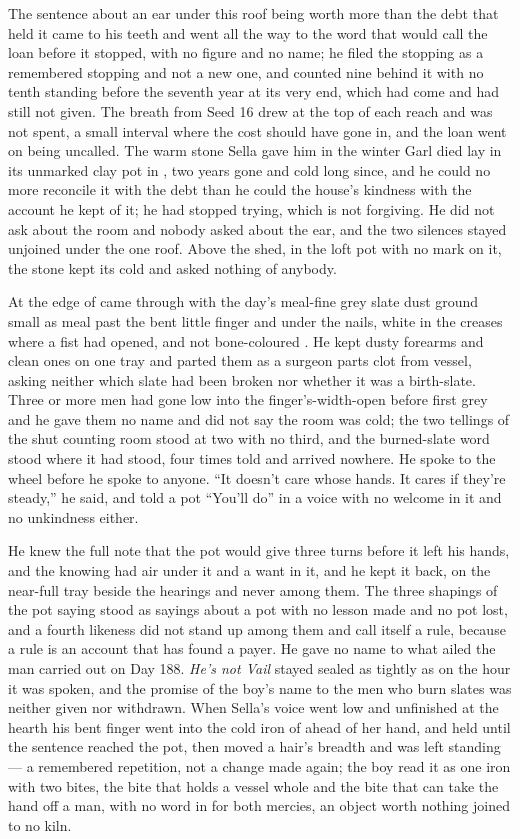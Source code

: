 The sentence about an ear under this roof being worth more than the debt that held it came to his teeth and went all the way to the word that would call the loan before it stopped, with no figure and no name; he filed the stopping as a remembered stopping and not a new one, and counted nine behind it with no tenth standing before the seventh year at its very end, which had come and had still not given. The breath from Seed 16 drew at the top of each reach and was not spent, a small interval where the cost should have gone in, and the loan went on being uncalled. The warm stone Sella gave him in the winter Garl died lay in its unmarked clay pot in , two years gone and cold long since, and he could no more reconcile it with the debt than he could the house's kindness with the account he kept of it; he had stopped trying, which is not forgiving. He did not ask about the room and nobody asked about the ear, and the two silences stayed unjoined under the one roof. Above the shed, in the loft pot with no mark on it, the stone kept its cold and asked nothing of anybody.

At the edge of   came through with the day's meal-fine grey slate dust ground small as meal past the bent little finger and under the nails, white in the creases where a fist had opened, and not bone-coloured . He kept dusty forearms and clean ones on one tray and parted them as a surgeon parts clot from vessel, asking neither which slate had been broken nor whether it was a birth-slate. Three or more men had gone low into the finger's-width-open  before first grey and he gave them no name and did not say the room was cold; the two tellings of the shut counting room stood at two with no third, and the burned-slate word stood where it had stood, four times told and arrived nowhere. He spoke to the wheel before he spoke to anyone. “It doesn't care whose hands. It cares if they're steady,” he said, and told a pot “You'll do” in a voice with no welcome in it and no unkindness either.

He knew the full note that the pot would give three turns before it left his hands, and the knowing had air under it and a want in it, and he kept it back, on the near-full tray beside the hearings and never among them. The three shapings of the pot saying stood as sayings about a pot with no lesson made and no pot lost, and a fourth likeness did not stand up among them and call itself a rule, because a rule is an account that has found a payer. He gave no name to what ailed the man carried out on Day 188. \emph{He's not Vail} stayed sealed as tightly as on the hour it was spoken, and the promise of the boy's name to the men who burn slates was neither given nor withdrawn. When Sella's voice went low and unfinished at the hearth his bent finger went into the cold iron of  ahead of her hand, and held until the sentence reached the pot, then moved a hair's breadth and was left standing --- a remembered repetition, not a change made again; the boy read it as one iron with two bites, the bite that holds a vessel whole and the bite that can take the hand off a man, with no word in  for both mercies, an object worth nothing joined to no kiln.

